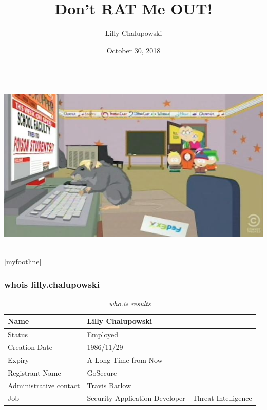 \documentclass[aspectratio=169]{beamer}
\title{Don't RAT Me OUT!}
\institute{GoSecure}
\author{Lilly Chalupowski}
\date{October 30, 2018}
\begin{document}
\begin{frame}[t]
  \begin{center}
    \begingroup
    \fontsize{20pt}{20pt}\selectfont
    \inserttitle \\
    \endgroup
    \bigskip
    \includegraphics[scale=0.45]{wikileaks} \\
    \bigskip
    \insertauthor \\
    \insertdate
  \end{center}
\end{frame}

[myfootline]

\begin{frame}
  \frametitle{whois lilly.chalupowski}
  \begin{table}
    \caption{\textit{who.is results}}
    \begin{tabularx}{\textwidth}{|X|X|}
      \hline
      Name & Lilly Chalupowski \\
      \hline
      Status & Employed \\
      \hline
      Creation Date & 1986/11/29 \\
      \hline
      Expiry & A Long Time from Now \\
      \hline
      Registrant Name & GoSecure \\
      \hline
      Administrative contact & Travis Barlow \\
      \hline
      Job & Security Application Developer - Threat Intelligence \\
      \hline
    \end{tabularx}
  \end{table}
\end{frame}
\end{document}
